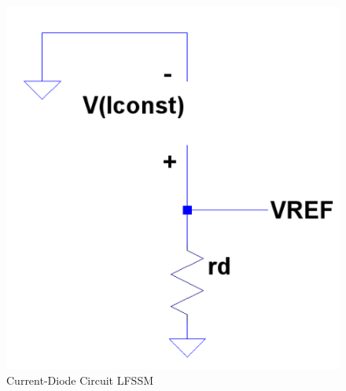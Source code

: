 \documentclass[conference]{IEEEtran}
\begin{document}
\begin{figure}[!htbp]
  \centering
  \includegraphics[scale=0.25]{images/cm-diode1-ss.png}
  \caption[cm-diode1-ss]{Current-Diode Circuit LFSSM}
  \label{fig:cm-diode1-ss}
\end{figure}
\end{document}
